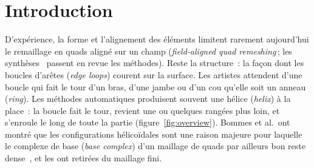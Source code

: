 \documentclass[11pt,a4paper]{article}
\begin{document}
\section{Introduction}

D'expérience, la forme et l'alignement des éléments limitent rarement
aujourd'hui le remaillage en quads aligné sur un champ (\emph{field-aligned
quad remeshing}\,; les synthèses~\cite{bommes2013survey,campen2017survey} passent en revue les méthodes). Reste la structure~: la
façon dont les boucles d'arêtes (\emph{edge loops}) courent sur la surface.
Les artistes attendent d'une boucle qui fait le tour d'un bras, d'une jambe
ou d'un cou qu'elle soit un anneau (\emph{ring}). Les méthodes automatiques
produisent souvent une hélice (\emph{helix}) à la place~: la boucle fait le
tour, revient une ou quelques rangées plus loin, et s'enroule le long de
toute la partie (figure~\ref{fig:overview}). Bommes et al.\ ont montré que
les configurations hélicoïdales sont une raison majeure pour laquelle le
complexe de base (\emph{base complex}) d'un maillage de quads par ailleurs
bon reste dense~\cite{bommes2011structure}, et les ont retirées du maillage
fini.
\end{document}
